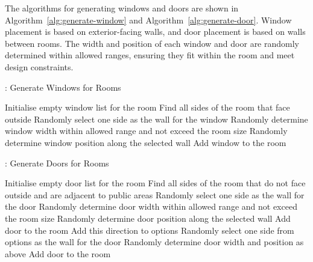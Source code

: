 \documentclass[]{article}
\begin{document}
The algorithms for generating windows and doors are shown in Algorithm~\ref{alg:generate-window} and Algorithm~\ref{alg:generate-door}. Window placement is based on exterior-facing walls, and door placement is based on walls between rooms. The width and position of each window and door are randomly determined within allowed ranges, ensuring they fit within the room and meet design constraints.
\begin{algorithm}[H]
    \caption{: Generate Windows for Rooms}
    \label{alg:generate-window}
    \begin{algorithmic}[1]
        \STATE Initialise empty window list for the room
        \STATE Find all sides of the room that face outside
        \STATE Randomly select one side as the wall for the window
        \STATE Randomly determine window width within allowed range and not exceed the room size
        \STATE Randomly determine window position along the selected wall
        \STATE Add window to the room
        \ENDIF
        \ENDIF
        \ENDFOR
    \end{algorithmic}
\end{algorithm}

\begin{algorithm}[H]
    \caption{: Generate Doors for Rooms}
    \label{alg:generate-door}
    \begin{algorithmic}[1]
        \STATE Initialise empty door list for the room
        \STATE Find all sides of the room that do not face outside and are adjacent to public areas
        \STATE Randomly select one side as the wall for the door
        \STATE Randomly determine door width within allowed range and not exceed the room size
        \STATE Randomly determine door position along the selected wall
        \STATE Add door to the room
        \ELSE
        \STATE Add this direction to options
        \ENDIF
        \ENDFOR
        \STATE Randomly select one side from options as the wall for the door
        \STATE Randomly determine door width and position as above
        \STATE Add door to the room
        \ENDIF
        \ENDIF
        \ENDIF
        \ENDFOR
    \end{algorithmic}
\end{algorithm}
\end{document}
